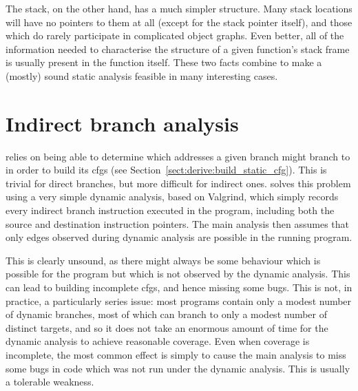 The stack, on the other hand, has a much simpler structure.  Many
stack locations will have no pointers to them at all (except for the
stack pointer itself), and those which do rarely participate in
complicated object graphs.  Even better, all of the information needed
to characterise the structure of a given function's stack frame is
usually present in the function itself.  These two facts combine to
make a (mostly) sound static analysis feasible in many interesting
cases.


\section{Indirect branch analysis}
\label{sect:program_model:indirect_branches}


{\Technique} relies on being able to determine which addresses a given
branch might branch to in order to build its \glspl{cfg} (see
Section~\ref{sect:derive:build_static_cfg}).  This is trivial for
direct branches, but more difficult for indirect ones.
{\Implementation} solves this problem using a very simple dynamic
analysis, based on Valgrind\cite{Nethercote2007}, which simply records
every indirect branch instruction executed in the program, including
both the source and destination instruction pointers.  The main
analysis then assumes that only edges observed during dynamic analysis
are possible in the running program.

This is clearly unsound, as there might always be some behaviour which
is possible for the program but which is not observed by the dynamic
analysis.  This can lead to {\technique} building incomplete
\glspl{cfg}, and hence missing some bugs.  This is not, in practice, a
particularly series issue: most programs contain only a modest number
of dynamic branches, most of which can branch to only a modest number
of distinct targets, and so it does not take an enormous amount of
time for the dynamic analysis to achieve reasonable coverage.  Even
when coverage is incomplete, the most common effect is simply to cause
the main analysis to miss some bugs in code which was not run under
the dynamic analysis.  This is usually a tolerable weakness.

